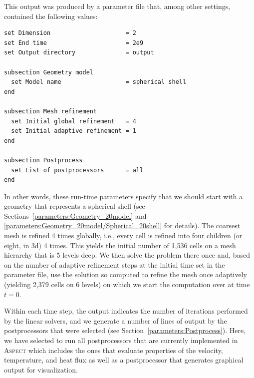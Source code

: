 \documentclass{article}
\newcommand{\aspect}{\textsc{Aspect}}
\begin{document}
This output was produced by a parameter file that, among other settings,
contained the following values:
\begin{lstlisting}[frame=single,language=prmfile]
set Dimension                     = 2
set End time                      = 2e9
set Output directory              = output

subsection Geometry model
  set Model name                  = spherical shell
end

subsection Mesh refinement
  set Initial global refinement   = 4
  set Initial adaptive refinement = 1
end

subsection Postprocess
  set List of postprocessors      = all
end
\end{lstlisting}
In other words, these run-time parameters specify that we should start with a
geometry that represents a spherical shell (see
Sections~\ref{parameters:Geometry_20model} and
\ref{parameters:Geometry_20model/Spherical_20shell} for details). The coarsest
mesh is refined 4 times globally, i.e., every cell is refined into four
children (or eight, in 3d) 4 times. This yields the initial number of 1,536
cells on a mesh hierarchy that is 5 levels deep. We then solve the problem
there once and, based on the number of adaptive refinement steps at the
initial time set in the parameter file, use the solution so computed to refine
the mesh once adaptively (yielding 2,379 cells on 6 levels) on which we start
the computation over at time $t=0$.

Within each time step, the output indicates the number of iterations performed
by the linear solvers, and we generate a number of lines of output by the
postprocessors that were selected (see
Section~\ref{parameters:Postprocess}). Here, we have selected to run all
postprocessors that are currently implemented in \aspect{} which includes the
ones that evaluate properties of the velocity, temperature, and heat flux as
well as a postprocessor that generates graphical output for visualization.
\end{document}

